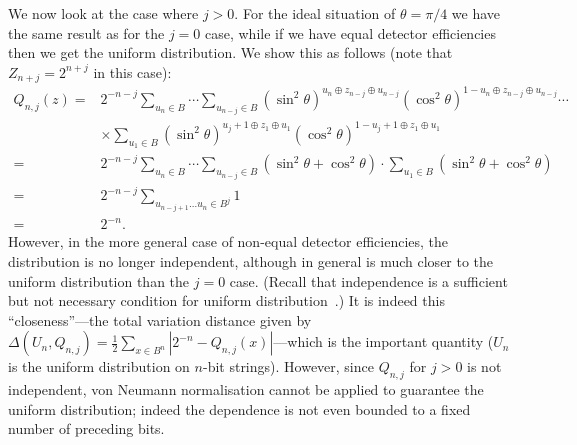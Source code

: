 \documentclass{mscs}
\begin{document}
We now look at the case where $j>0$. For the ideal situation of $\theta=\pi/4$ we have the same result as for the $j=0$ case, while if we have equal detector efficiencies then we get the uniform distribution. We show this as follows (note that $Z_{n+j}=2^{n+j}$ in this case):
\begin{align*}
	Q_{n,j}(z) =& 2^{-n-j}\sum_{u_n\in B}\cdots \sum_{u_{n-j}\in B}(\sin^2\theta)^{u_n \oplus z_{n-j}\oplus u_{n-j}}(\cos^2\theta)^{1-u_n \oplus z_{n-j}\oplus u_{n-j}}\cdots\\&\times \sum_{u_1 \in B} (\sin^2\theta)^{u_j+1 \oplus z_{1}\oplus u_{1}}(\cos^2\theta)^{1-u_j+1 \oplus z_{1}\oplus u_{1}}\\
	=& 2^{-n-j}\sum_{u_n\in B}\cdots \sum_{u_{n-j}\in B}(\sin^2\theta + \cos^2\theta)\cdot \sum_{u_1 \in B}(\sin^2\theta + \cos^2\theta)\\
	=& 2^{-n-j}\sum_{u_{n-j+1}\dots u_n \in B^j}1\\
	=& 2^{-n}.
\end{align*}
However, in the more general case of non-equal detector efficiencies, the distribution is no longer independent, although in general is much closer to the uniform distribution than the $j=0$ case.
(Recall that independence is a sufficient but not necessary condition for uniform distribution~\citep{AbbottCalude10}.) It is indeed this ``closeness''---the total variation distance given by $\Delta(U_n,Q_{n,j}) = \frac{1}{2}\sum_{x\in B^n}|2^{-n} - Q_{n,j}(x)|$---which is the important quantity ($U_n$ is the uniform distribution on $n$-bit strings). However, since $Q_{n,j}$ for $j>0$ is not independent, von Neumann normalisation cannot be applied to guarantee the uniform distribution; indeed the dependence is not even bounded to a fixed number of preceding bits.
\end{document}
